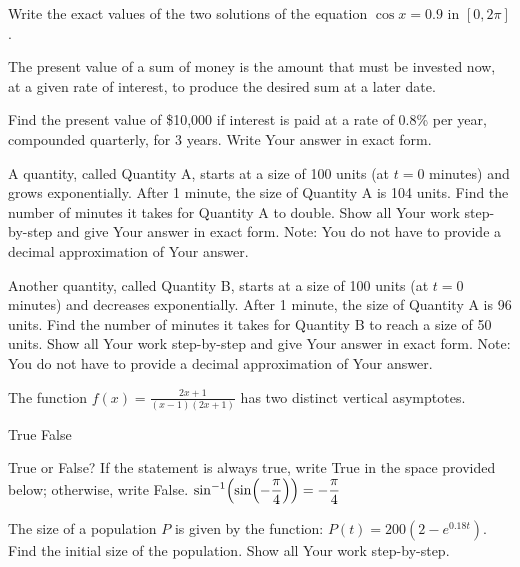 \documentclass[11pt,answers]{exam}
\let\originalleft\left
\let\originalright\right
\renewcommand{\left}{\mathopen{}\mathclose\bgroup\originalleft}
\renewcommand{\right}{\aftergroup\egroup\originalright}
\begin{document}
\begin{questions}
\fillwithdottedlines{2cm}

 \question[2] Write the exact values of the two solutions of the equation $\displaystyle \cos x = 0.9$ in $[0,2\pi ]$.

\fillwithdottedlines{1.5cm}	

\question[2] The present value of a sum of money is the amount that must be invested now, at a given rate of interest, to produce the desired sum at a later date. 

Find the present value of \$10,000 if interest is paid at a rate of 0.8\% per year, compounded quarterly, for 3 years. Write Your answer in exact form.

\fillwithdottedlines{2cm}

\question[2] A quantity, called Quantity A, starts at a size of 100 units (at $t=0$ minutes) and grows exponentially. After 1 minute, the size of Quantity A is 104 units. Find the number of minutes it takes for Quantity A to double.    Show all Your work step-by-step and give Your answer in exact form. Note: You do not have to provide a decimal approximation of Your answer.


\fillwithdottedlines{2cm}

\question[2] Another quantity, called Quantity B, starts at a size of 100 units (at $t=0$ minutes) and decreases exponentially. After 1 minute, the size of Quantity A is 96 units. Find the number of minutes it takes for Quantity B to reach a size of 50 units.     Show all Your work step-by-step and give Your answer in exact form. Note: You do not have to provide a decimal approximation of Your answer.

\fillwithdottedlines{2cm}\bonusquestion[1] The function $\displaystyle f(x)=\frac{2x+1}{(x-1)(2x+1)}$ has two distinct vertical asymptotes. 
\begin{oneparchoices}
\choice True \choice False
\end{oneparchoices}

\bonusquestion[1]
True or False? If the statement is always true, write True in the space provided below; otherwise, write False.
$\displaystyle \sin^{-1}\left ( \sin \left ( -\frac{\pi}{4}\right ) \right ) = -\frac{\pi}{4}$ \dotfill



\question[2] The size of a population $P$ is given by the function: $\displaystyle P(t)=200(2-e^{0.18t})$. Find the initial size of the population. Show all Your work step-by-step.

\fillwithdottedlines{2cm}	


\end{questions}
\end{document}
